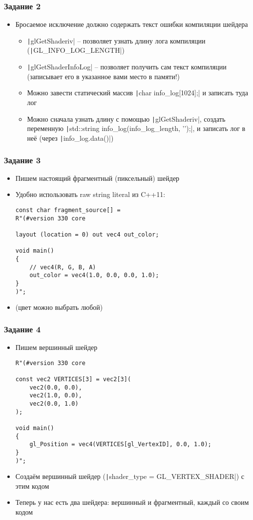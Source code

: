 \documentclass[10pt]{beamer}
\begin{document}
\begin{frame}[fragile]
\frametitle{Задание 2}
\begin{itemize}
\item Бросаемое исключение должно содержать текст ошибки компиляции шейдера
\begin{itemize}
\item \texttt|glGetShaderiv| -- позволяет узнать длину лога компиляции (\texttt|GL_INFO_LOG_LENGTH|)
\item \texttt|glGetShaderInfoLog| -- позволяет получить сам текст компиляции (записывает его в указанное вами место в памяти!)
\item Можно завести статический массив \texttt|char info_log[1024];| и записать туда лог
\item Можно сначала узнать длину с помощью \texttt|glGetShaderiv|, создать переменную \texttt|std::string info_log(info_log_length, '\0');|, и записать лог в неё (через \texttt|info_log.data()|)
\end{itemize}
\end{itemize}
\end{frame}

\begin{frame}[fragile]
\frametitle{Задание 3}
\begin{itemize}
\item Пишем настоящий фрагментный (пиксельный) шейдер
\item Удобно использовать raw string literal из C++11:
\begin{verbatim}
const char fragment_source[] =
R"(#version 330 core

layout (location = 0) out vec4 out_color;

void main()
{
    // vec4(R, G, B, A)
    out_color = vec4(1.0, 0.0, 0.0, 1.0);
}
)";
\end{verbatim}
\item (цвет можно выбрать любой)
\end{itemize}
\end{frame}

\begin{frame}[fragile]
\frametitle{Задание 4}
\begin{itemize}
\item Пишем вершинный шейдер
\begin{verbatim}
R"(#version 330 core

const vec2 VERTICES[3] = vec2[3](
    vec2(0.0, 0.0),
    vec2(1.0, 0.0),
    vec2(0.0, 1.0)
);

void main()
{
    gl_Position = vec4(VERTICES[gl_VertexID], 0.0, 1.0);
}
)";
\end{verbatim}
\item Создаём вершинный шейдер (\texttt|shader_type = GL_VERTEX_SHADER|) с этим кодом
\item Теперь у нас есть два шейдера: вершинный и фрагментный, каждый со своим кодом
\end{itemize}
\end{frame}
\end{document}
